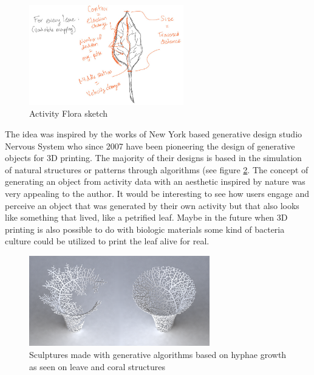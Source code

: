 \documentclass[../medieninformatik-arbeit.tex]{subfiles}
\begin{document}
\begin{figure}[h]
\captionsetup{width=0.6\textwidth}
\begin{center}
  \includegraphics[width=0.6\textwidth]{Prototype/img/ActivityFlora_detail}
  \caption{Activity Flora sketch}
\label{fig:activityflora}
\end{center}
\end{figure}

The idea was inspired by the works of New York based generative design studio Nervous System\cite{nervousStudio} who since 2007 have been pioneering the design of generative objects for 3D printing. The majority of their designs is based in the simulation of natural structures or patterns through algorithms (see figure \ref{fig:nervous}. The concept of generating an object from activity data with an aesthetic inspired by nature was very appealing to the author. It would be interesting to see how users engage and perceive an object that was generated by their own activity but that also looks like something that lived, like a petrified leaf. Maybe in the future when 3D printing is also possible to do with biologic materials some kind of bacteria culture could be utilized to print the leaf alive for real. 

\begin{figure}[h]
\captionsetup{width=0.7\textwidth}
\begin{center}
  \includegraphics[width=0.7\textwidth]{Prototype/img/nervous}
  \caption{Sculptures made with generative algorithms based on hyphae growth as seen on leave and coral structures\cite{nervousHyphae}}
\label{fig:nervous}
\end{center}
\end{figure}
\end{document}
